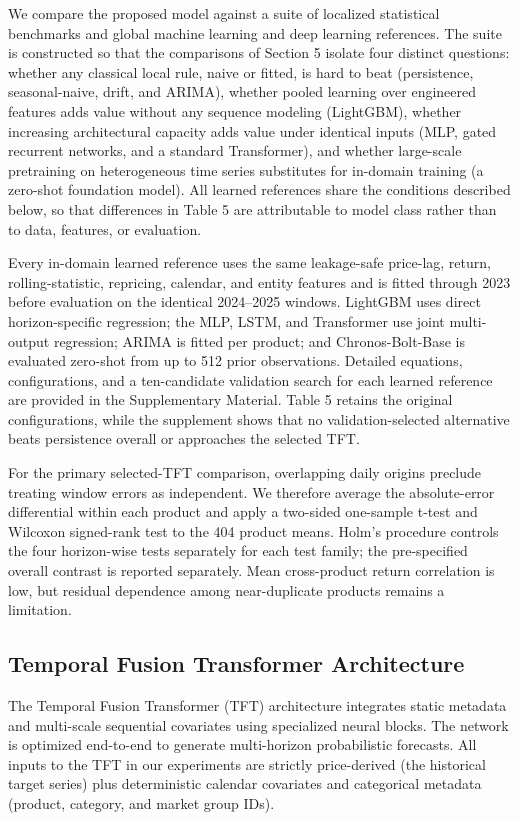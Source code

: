 \documentclass[review,3p,times]{elsarticle}
\begin{document}
We compare the proposed model against a suite of localized statistical benchmarks and global machine learning and deep learning references. The suite is constructed so that the comparisons of Section 5 isolate four distinct questions: whether any classical local rule, naive or fitted, is hard to beat (persistence, seasonal-naive, drift, and ARIMA), whether pooled learning over engineered features adds value without any sequence modeling (LightGBM), whether increasing architectural capacity adds value under identical inputs (MLP, gated recurrent networks, and a standard Transformer), and whether large-scale pretraining on heterogeneous time series substitutes for in-domain training (a zero-shot foundation model). All learned references share the conditions described below, so that differences in Table 5 are attributable to model class rather than to data, features, or evaluation.

Every in-domain learned reference uses the same leakage-safe price-lag, return, rolling-statistic, repricing, calendar, and entity features and is fitted through 2023 before evaluation on the identical 2024--2025 windows. LightGBM uses direct horizon-specific regression; the MLP, LSTM, and Transformer use joint multi-output regression; ARIMA is fitted per product; and Chronos-Bolt-Base is evaluated zero-shot from up to 512 prior observations. Detailed equations, configurations, and a ten-candidate validation search for each learned reference are provided in the Supplementary Material. Table 5 retains the original configurations, while the supplement shows that no validation-selected alternative beats persistence overall or approaches the selected TFT.

For the primary selected-TFT comparison, overlapping daily origins preclude treating window errors as independent. We therefore average the absolute-error differential within each product and apply a two-sided one-sample t-test and Wilcoxon signed-rank test to the 404 product means. Holm's procedure controls the four horizon-wise tests separately for each test family; the pre-specified overall contrast is reported separately. Mean cross-product return correlation is low, but residual dependence among near-duplicate products remains a limitation.


\subsection{Temporal Fusion Transformer Architecture}

The Temporal Fusion Transformer (TFT) architecture integrates static metadata and multi-scale sequential covariates using specialized neural blocks. The network is optimized end-to-end to generate multi-horizon probabilistic forecasts. All inputs to the TFT in our experiments are strictly price-derived (the historical target series) plus deterministic calendar covariates and categorical metadata (product, category, and market group IDs).
\end{document}
